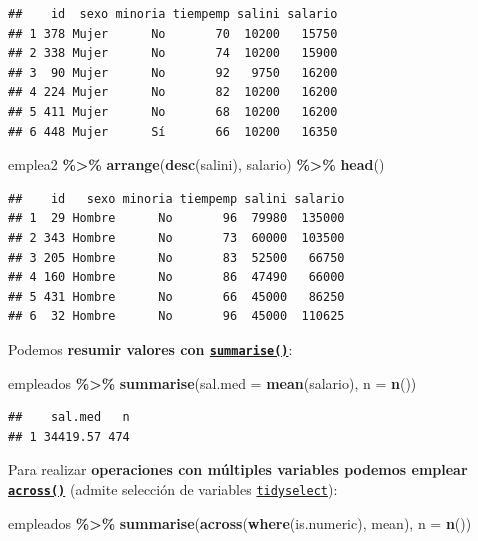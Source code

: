\documentclass[
]{book}
\newenvironment{Shaded}{\begin{snugshade}}{\end{snugshade}}
\newcommand{\AttributeTok}[1]{\textcolor[rgb]{0.13,0.29,0.53}{#1}}
\newcommand{\FunctionTok}[1]{\textcolor[rgb]{0.13,0.29,0.53}{\textbf{#1}}}
\newcommand{\NormalTok}[1]{#1}
\newcommand{\SpecialCharTok}[1]{\textcolor[rgb]{0.81,0.36,0.00}{\textbf{#1}}}
\theoremstyle{break}
\theoremstyle{nonumberplain}
\begin{document}
\begin{verbatim}
##    id  sexo minoria tiempemp salini salario
## 1 378 Mujer      No       70  10200   15750
## 2 338 Mujer      No       74  10200   15900
## 3  90 Mujer      No       92   9750   16200
## 4 224 Mujer      No       82  10200   16200
## 5 411 Mujer      No       68  10200   16200
## 6 448 Mujer      Sí       66  10200   16350
\end{verbatim}

\begin{Shaded}
\begin{Highlighting}[]
\NormalTok{emplea2 }\SpecialCharTok{\%\textgreater{}\%} \FunctionTok{arrange}\NormalTok{(}\FunctionTok{desc}\NormalTok{(salini), salario) }\SpecialCharTok{\%\textgreater{}\%} \FunctionTok{head}\NormalTok{()}
\end{Highlighting}
\end{Shaded}

\begin{verbatim}
##    id   sexo minoria tiempemp salini salario
## 1  29 Hombre      No       96  79980  135000
## 2 343 Hombre      No       73  60000  103500
## 3 205 Hombre      No       83  52500   66750
## 4 160 Hombre      No       86  47490   66000
## 5 431 Hombre      No       66  45000   86250
## 6  32 Hombre      No       96  45000  110625
\end{verbatim}

Podemos \textbf{resumir valores con \href{https://dplyr.tidyverse.org/reference/summarise.html}{\texttt{summarise()}}}:

\begin{Shaded}
\begin{Highlighting}[]
\NormalTok{empleados }\SpecialCharTok{\%\textgreater{}\%} \FunctionTok{summarise}\NormalTok{(}\AttributeTok{sal.med =} \FunctionTok{mean}\NormalTok{(salario), }\AttributeTok{n =} \FunctionTok{n}\NormalTok{())}
\end{Highlighting}
\end{Shaded}

\begin{verbatim}
##    sal.med   n
## 1 34419.57 474
\end{verbatim}

Para realizar \textbf{operaciones con múltiples variables podemos emplear \href{https://dplyr.tidyverse.org/reference/across.html}{\texttt{across()}}} (admite selección de variables \href{https://tidyselect.r-lib.org}{\texttt{tidyselect}}):

\begin{Shaded}
\begin{Highlighting}[]
\NormalTok{empleados }\SpecialCharTok{\%\textgreater{}\%} \FunctionTok{summarise}\NormalTok{(}\FunctionTok{across}\NormalTok{(}\FunctionTok{where}\NormalTok{(is.numeric), mean), }\AttributeTok{n =} \FunctionTok{n}\NormalTok{())}
\end{Highlighting}
\end{Shaded}
\end{document}
